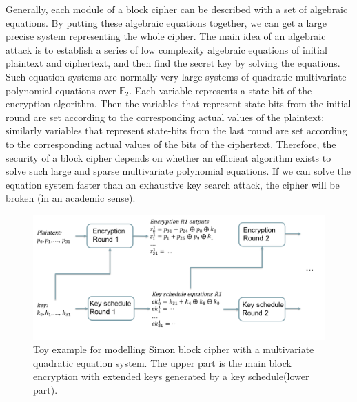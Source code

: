 Generally, each module of a block cipher can be described with a set of algebraic equations. By putting these algebraic equations together, we can get a large precise system representing the whole cipher. The main idea of an algebraic attack is to establish a series of low complexity algebraic equations of initial plaintext and ciphertext, and then find the secret key by solving the equations. Such equation systems are normally very large systems of quadratic multivariate polynomial equations over $\mathbb{F}_2$. Each variable represents a state-bit of the encryption algorithm. Then the variables that represent state-bits from the initial round are set according to the corresponding actual values of the plaintext; similarly variables that represent state-bits from the last round are set according to the corresponding actual values of the bits of the ciphertext. Therefore, the security of a block cipher depends on whether an efficient algorithm exists to solve such large and sparse multivariate polynomial equations. If we can solve the equation system faster than an exhaustive key search attack, the cipher will be broken (in an academic sense).
\begin{figure}[h!]
	\centering
	\includegraphics[width=130mm]{./pics/ch3ACmodeling.png}	
	\caption[Toy example for modelling Simon block cipher with a multivariate quadratic equation system]{Toy example for modelling Simon block cipher with a multivariate quadratic equation system. The upper part is the main block encryption with extended keys generated by a key schedule\protect\footnotemark (lower part). }
	\label{fig:ch3ACmodeling}
\end{figure}	

